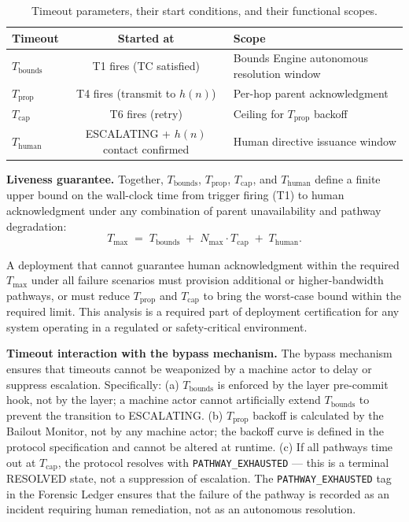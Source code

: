 \begin{table}[htbp]
\caption{Timeout parameters, their start conditions, and their functional scopes.}
\label{tab:bailout-timeouts}
\begin{tabular}{@{}lcl@{}}
\toprule
\textbf{Timeout} & \textbf{Started at} & \textbf{Scope} \\
\midrule
$T_{\text{bounds}}$ & T1 fires (TC satisfied) & Bounds Engine autonomous resolution window \\
$T_{\text{prop}}$ & T4 fires (transmit to $h(n)$) & Per-hop parent acknowledgment \\
$T_{\text{cap}}$ & T6 fires (retry) & Ceiling for $T_{\text{prop}}$ backoff \\
$T_{\text{human}}$ & ESCALATING + $h(n)$ contact confirmed & Human directive issuance window \\
\bottomrule
\end{tabular}
\end{table}

\bigskip
\noindent\textbf{Liveness guarantee.} Together, $T_{\text{bounds}}$, $T_{\text{prop}}$, $T_{\text{cap}}$, and $T_{\text{human}}$ define a finite upper bound on the wall-clock time from trigger firing (T1) to human acknowledgment under any combination of parent unavailability and pathway degradation:
\begin{equation}
T_{\max} \;=\; T_{\text{bounds}} \;+\; N_{\max} \cdot T_{\text{cap}} \;+\; T_{\text{human}}. \tag{T-max}
\end{equation}

A deployment that cannot guarantee human acknowledgment within the required $T_{\max}$ under all failure scenarios must provision additional or higher-bandwidth pathways, or must reduce $T_{\text{prop}}$ and $T_{\text{cap}}$ to bring the worst-case bound within the required limit. This analysis is a required part of deployment certification for any \bxthree{} system operating in a regulated or safety-critical environment.

\bigskip
\noindent\textbf{Timeout interaction with the bypass mechanism.} The bypass mechanism ensures that timeouts cannot be weaponized by a machine actor to delay or suppress escalation. Specifically: (a) $T_{\text{bounds}}$ is enforced by the \fact{} layer pre-commit hook, not by the \bounds{} layer; a machine actor cannot artificially extend $T_{\text{bounds}}$ to prevent the transition to ESCALATING. (b) $T_{\text{prop}}$ backoff is calculated by the Bailout Monitor, not by any machine actor; the backoff curve is defined in the protocol specification and cannot be altered at runtime. (c) If all pathways time out at $T_{\text{cap}}$, the protocol resolves with \texttt{PATHWAY\_EXHAUSTED} --- this is a terminal RESOLVED state, not a suppression of escalation. The \texttt{PATHWAY\_EXHAUSTED} tag in the Forensic Ledger ensures that the failure of the pathway is recorded as an incident requiring human remediation, not as an autonomous resolution.